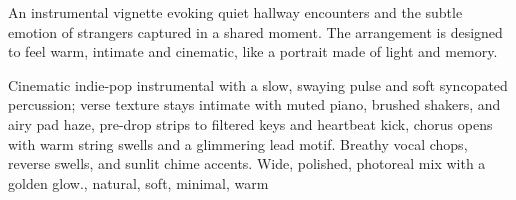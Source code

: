 

\begin{notes}
An instrumental vignette evoking quiet hallway encounters and the subtle emotion of strangers captured in a shared moment. %
The arrangement is designed to feel warm, intimate and cinematic, like a portrait made of light and memory.
\end{notes}

\begin{style}
Cinematic indie-pop instrumental with a slow, swaying pulse and soft syncopated percussion; verse texture stays intimate with muted piano, brushed shakers, and airy pad haze, pre-drop strips to filtered keys and heartbeat kick, chorus opens with warm string swells and a glimmering lead motif. %
Breathy vocal chops, reverse swells, and sunlit chime accents. %
Wide, polished, photoreal mix with a golden glow., natural, soft, minimal, warm
\end{style}

